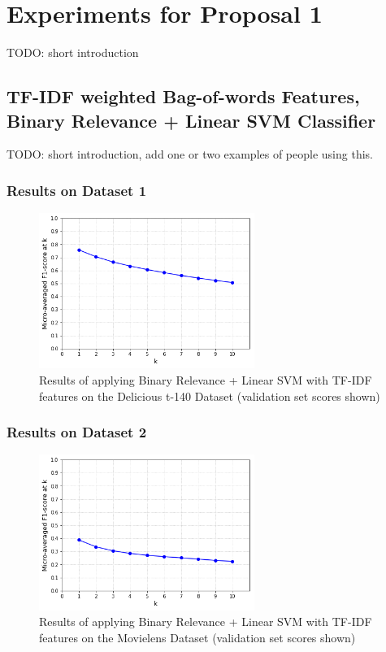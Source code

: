 \section{Experiments for Proposal 1}\label{section:experiment_part_1}

{\color{red} TODO: short introduction}

\subsection{TF-IDF weighted Bag-of-words Features, Binary Relevance + Linear SVM Classifier}

{\color{red} TODO: short introduction, add one or two examples of people using this.}

\subsubsection{Results on Dataset 1}

\begin{figure}[H]
    \centering
    \includegraphics[width=7cm]{chapters/05_experiments/images/svm-tf-idf-delicious-20-frac.png}
    \caption{Results of applying Binary Relevance + Linear SVM with TF-IDF features on the Delicious t-140 Dataset (validation set scores shown)}
    \label{fig:ovr_svm_movielens}
\end{figure}

\subsubsection{Results on Dataset 2}

\begin{figure}[H]
    \centering
    \includegraphics[width=7cm]{chapters/05_experiments/images/svm-tf-idf-movielens.png}
    \caption{Results of applying Binary Relevance + Linear SVM with TF-IDF features on the Movielens Dataset (validation set scores shown)}
    \label{fig:ovr_svm_movielens}
\end{figure}

